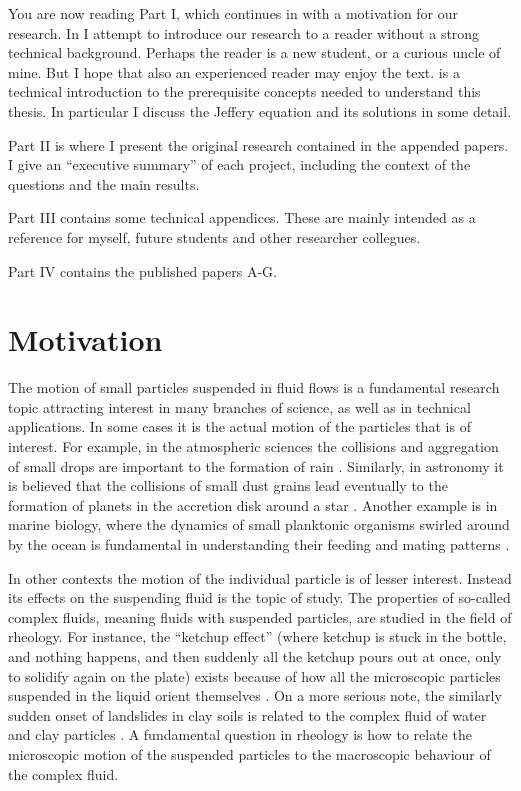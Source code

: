 \documentclass[thesis.tex]{subfiles}
\begin{document}
You are now reading Part I, which continues in  with a motivation for our research.
In  I attempt to introduce our research to a reader without a strong technical background. Perhaps the reader is a new student, or a curious uncle of mine. But I hope that also an experienced reader may enjoy the text.
 is a technical introduction to the prerequisite concepts needed to understand this thesis. In particular I discuss the Jeffery equation and its solutions in some detail. 

Part II is where I present the original research contained in the appended papers. I give an ``executive summary'' of each project, including the context of the questions and the main results.

Part III contains some technical appendices. These are mainly intended as a reference for myself, future students and other researcher collegues.

Part IV contains the published papers A-G.


\chapter{Motivation}\label{sec:motivation}

The motion of small particles suspended in fluid flows is a fundamental research topic attracting interest in many branches of science, as well as in technical applications. In some cases it is the actual motion of the particles that is of interest. For example, in the atmospheric sciences the collisions and aggregation of small drops are important to the formation of rain \cite{devenish2012}. Similarly, in astronomy it is believed that the collisions of small dust grains lead eventually to the formation of planets in the accretion disk around a star \cite{wilkinson2008}. Another example is in marine biology, where the dynamics of small planktonic organisms swirled around by the ocean is fundamental in understanding their feeding and mating patterns \cite{guasto2012}. 

In other contexts the motion of the individual particle is of lesser interest. Instead its effects on the suspending fluid is the topic of study. The properties of so-called complex fluids, meaning fluids with suspended particles, are studied in the field of rheology. For instance, the ``ketchup effect'' (where ketchup is stuck in the bottle, and nothing happens, and then suddenly all the ketchup pours out at once, only to solidify again on the plate) exists because of how all the microscopic particles suspended in the liquid orient themselves \cite{bayod2008}. On a more serious note, the similarly sudden onset of landslides in clay soils is related to the complex fluid of water and clay particles \cite{coussot2002}. A fundamental question in rheology is how to relate the microscopic motion of the suspended particles to the macroscopic behaviour of the complex fluid.
\end{document}
